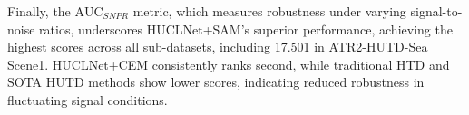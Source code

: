\par
Finally, the $\text{AUC}_{SNPR}$ metric, which measures robustness under varying signal-to-noise ratios, underscores HUCLNet+SAM's superior performance, achieving the highest scores across all sub-datasets, including 17.501 in ATR2-HUTD-Sea Scene1. HUCLNet+CEM consistently ranks second, while traditional HTD and SOTA HUTD methods show lower scores, indicating reduced robustness in fluctuating signal conditions.
\par


